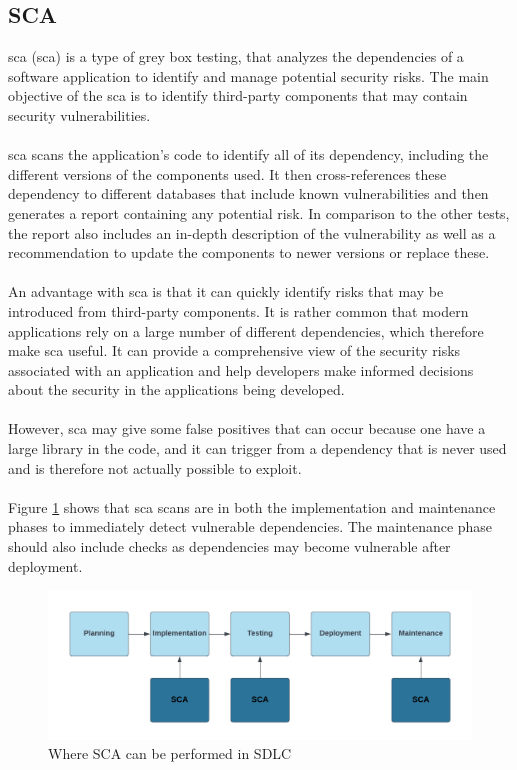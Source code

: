 \subsection{SCA}
\acrlong{sca} (\acrshort{sca}) is a type of grey box testing, that analyzes the dependencies of a software application to identify and manage potential security risks. The main objective of the \acrshort{sca} is to identify third-party components that may contain security vulnerabilities. \cite{sca}
\\~\\
\acrshort{sca} scans the application's code to identify all of its \gls{dependency}, including the different versions of the components used. It then cross-references these \gls{dependency} to different databases that include known vulnerabilities and then generates a report containing any potential risk. In comparison to the other tests, the report also includes an in-depth description of the vulnerability as well as a recommendation to update the components to newer versions or replace these. 
\\~\\
An advantage with \acrshort{sca} is that it can quickly identify risks that may be introduced from third-party components. It is rather common that modern applications rely on a large number of different dependencies, which therefore make \acrshort{sca} useful. It can provide a comprehensive view of the security risks associated with an application and help developers make informed decisions about the security in the applications being developed. 
\\~\\
However, \acrshort{sca} may give some false positives that can occur because one have a large library in the code, and it can trigger from a dependency that is never used and is therefore not actually possible to exploit.
\\~\\
Figure \ref{fig: Where to perform SCA in SDLC} shows that \acrshort{sca} scans are in both the implementation and maintenance phases to immediately detect vulnerable dependencies. The maintenance phase should also include checks as dependencies may become vulnerable after deployment.
\vspace{2mm}
\begin{figure}[H]
    \centering
    \includegraphics[width=0.8\columnwidth]{Images/sca.png}
    \caption{Where SCA can be performed in SDLC} 
    \label{fig: Where to perform SCA in SDLC}
\end{figure}

